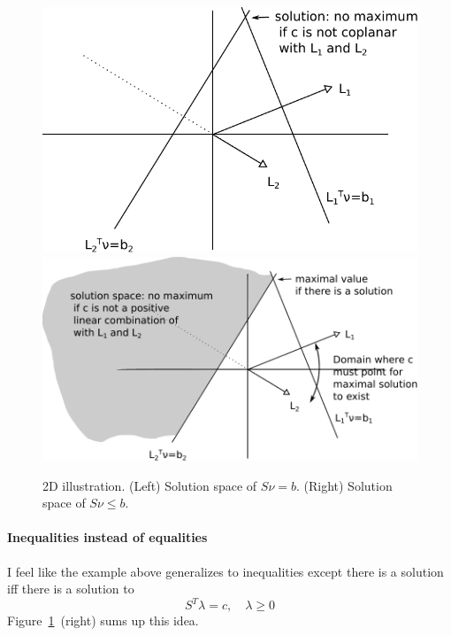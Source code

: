 \documentclass[12pt]{scrartcl}
\newcommand\reft[3][]{#2~\ref{#3}#1}
\theoremstyle{definition}
\theoremstyle{remark}
\numberwithin{equation}{section}
\newcommand\reffigt[2][]{\reft[#1]{Figure}{#2}}
\begin{document}
\begin{figure}[ht]
  \centering
  \includegraphics[width=0.4\linewidth]{2D_duality}
  \includegraphics[width=0.55\linewidth]{2D_duality_inequalities}
  \caption{2D illustration. (Left) Solution space of $S\nu = b$. (Right) Solution space of $S\nu \leq b$.}
  \label{fig:2D_duality}
\end{figure}


\paragraph{Inequalities instead of equalities} I feel like the example above generalizes to inequalities except there is a solution iff there is a solution to
\[
S^T\lambda = c, \quad \lambda \geq 0
\]
\reffigt{fig:2D_duality}~(right) sums up this idea.

%
%
\end{document}
